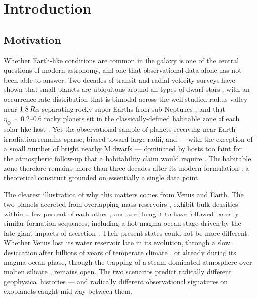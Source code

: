 \chapter{Introduction}
\label{chap:introduction}


\section{Motivation}
\label{sec:motivation}

Whether Earth-like conditions are common in the galaxy is one of the
central questions of modern astronomy, and one that observational
data alone has not been able to answer.  Two decades of transit and
radial-velocity surveys have shown that small planets are ubiquitous
around all types of dwarf stars \parencite{Fressin2013,Bergsten2022},
with an occurrence-rate distribution that is bimodal across the
well-studied radius valley near $1.8\,R_{\oplus}$ separating rocky
super-Earths from sub-Neptunes \parencite{Fulton2017}, and that
$\eta_\oplus\sim 0.2$--$0.6$ rocky planets sit in the classically-defined
habitable zone of each solar-like host
\parencite{Bryson2021,Kunimoto2020}.
Yet the observational sample of planets receiving near-Earth
irradiation remains sparse, biased toward large radii, and --- with
the exception of a small number of bright nearby M dwarfs ---
dominated by hosts too faint for the atmospheric follow-up that a
habitability claim would require
\parencite{Bean2017,LustigYaeger2019}.  The habitable zone therefore
remains, more than three decades after its modern formulation
\parencite{Kasting1988,Kopparapu2013}, a theoretical construct
grounded on essentially a single data point.

The clearest illustration of why this matters comes from Venus and
Earth.  The two planets accreted from overlapping mass reservoirs
\parencite{Kleine2020,Raymond2020}, exhibit bulk densities within a
few percent of each other \parencite{Smrekar2018}, and are thought to
have followed broadly similar formation sequences, including a hot
magma-ocean stage driven by the late giant impacts of accretion
\parencite{Gillmann2020,ElkinsTanton2012,Lichtenberg2022}.  Their
present states could not be more different.  Whether Venus lost its
water reservoir late in its evolution, through a slow desiccation
after billions of years of temperate climate \parencite{WayGenio2020},
or already during its magma-ocean phase, through the trapping of a
steam-dominated atmosphere over molten silicate
\parencite{Hamano2013,Turbet2021}, remains open.  The two scenarios
predict radically different geophysical histories --- and radically
different observational signatures on exoplanets caught mid-way
between them.

